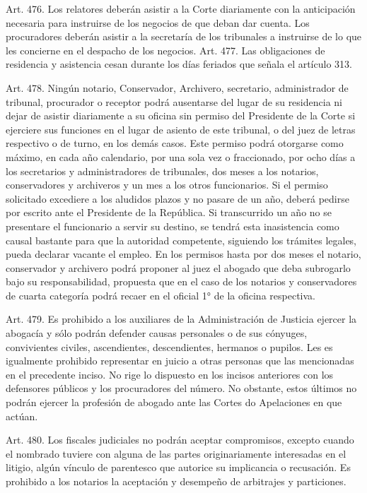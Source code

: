     Art. 476. Los relatores deberán asistir a la Corte diariamente con la anticipación necesaria para instruirse de los negocios de que deban dar cuenta.
    Los procuradores deberán asistir a la secretaría de los tribunales a instruirse de lo que les concierne en el despacho de los negocios.
    Art. 477. Las obligaciones de residencia y asistencia cesan durante los días feriados que señala el artículo 313.


    Art. 478. Ningún notario, Conservador, Archivero, secretario, administrador de tribunal, procurador o receptor podrá ausentarse del lugar de su residencia ni dejar de asistir diariamente a su oficina sin permiso del Presidente de la Corte si ejerciere sus funciones en el lugar de asiento de este tribunal, o del juez de letras respectivo o de turno, en los demás casos.
    Este permiso podrá otorgarse como máximo, en cada año calendario, por una sola vez o fraccionado, por ocho días a los secretarios y administradores de tribunales, dos meses a los notarios, conservadores y archiveros y un mes a los otros funcionarios. Si el permiso solicitado excediere a los aludidos plazos y no pasare de un año, deberá pedirse por escrito ante el Presidente de la República. Si transcurrido un año no se presentare el funcionario a servir su destino, se tendrá esta inasistencia como causal bastante para que la autoridad competente, siguiendo los trámites legales, pueda declarar vacante el empleo.
    En los permisos hasta por dos meses el notario, conservador y archivero podrá proponer al juez el abogado que deba subrogarlo bajo su responsabilidad, propuesta que en el caso de los notarios y conservadores de cuarta categoría podrá recaer en el oficial 1° de la oficina respectiva.



    Art. 479. Es prohibido a los auxiliares de la Administración de Justicia ejercer la abogacía y sólo podrán defender causas personales o de sus cónyuges, convivientes civiles, ascendientes, descendientes, hermanos o pupilos.
    Les es igualmente prohibido representar en juicio a otras personas que las mencionadas en el precedente inciso.
    No rige lo dispuesto en los incisos anteriores con los defensores públicos y los procuradores del número. No obstante, estos últimos no podrán ejercer la profesión de abogado ante las Cortes do Apelaciones en que actúan.



    Art. 480. Los fiscales judiciales no podrán aceptar compromisos, excepto cuando el nombrado tuviere con alguna de las partes originariamente interesadas en el litigio, algún vínculo de parentesco que autorice su implicancia o recusación.
    Es prohibido a los notarios la aceptación y desempeño de arbitrajes y particiones.



